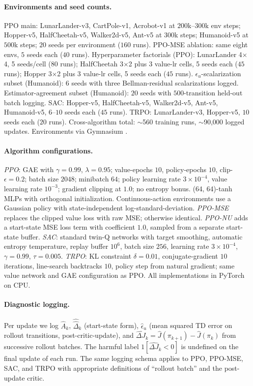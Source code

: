 \documentclass{article}
\begin{document}
\paragraph{Environments and seed counts.}
PPO main: LunarLander-v3, CartPole-v1, Acrobot-v1 at $200$k--$300$k env steps; Hopper-v5, HalfCheetah-v5, Walker2d-v5, Ant-v5 at $300$k steps; Humanoid-v5 at $500$k steps; $20$ seeds per environment ($160$ runs). PPO-MSE ablation: same eight envs, $5$ seeds each ($40$ runs). Hyperparameter factorials (PPO): LunarLander 4$\times$4, 5 seeds/cell ($80$ runs); HalfCheetah 3$\times$2 plus 3 value-lr cells, 5 seeds each ($45$ runs); Hopper 3$\times$2 plus 3 value-lr cells, 5 seeds each ($45$ runs). $\epsilon_u$-scalarization subset (Humanoid): $6$ seeds with three Bellman-residual scalarizations logged. Estimator-agreement subset (Humanoid): $20$ seeds with $500$-transition held-out batch logging. SAC: Hopper-v5, HalfCheetah-v5, Walker2d-v5, Ant-v5, Humanoid-v5, $6$--$10$ seeds each ($45$ runs). TRPO: LunarLander-v3, Hopper-v5, $10$ seeds each ($20$ runs). Cross-algorithm total: $\sim$560 training runs, $\sim$90{,}000 logged updates. Environments via Gymnasium \citep{towers2024gymnasium}.

\paragraph{Algorithm configurations.}
\emph{PPO}: GAE \citep{schulman2015high} with $\gamma{=}0.99$, $\lambda{=}0.95$; value-epochs $10$, policy-epochs $10$, clip-$\epsilon = 0.2$; batch size $2048$; minibatch $64$; policy learning rate $3{\times}10^{-4}$, value learning rate $10^{-3}$; gradient clipping at $1.0$; no entropy bonus. (64, 64)-tanh MLPs with orthogonal initialization. Continuous-action environments use a Gaussian policy with state-independent log-standard-deviation. \emph{PPO-MSE} replaces the clipped value loss with raw MSE; otherwise identical. \emph{PPO-NU} adds a start-state MSE loss term with coefficient $1.0$, sampled from a separate start-state buffer. \emph{SAC}: standard twin-Q networks with target smoothing, automatic entropy temperature, replay buffer $10^6$, batch size $256$, learning rate $3{\times}10^{-4}$, $\gamma = 0.99$, $\tau = 0.005$. \emph{TRPO}: KL constraint $\delta = 0.01$, conjugate-gradient $10$ iterations, line-search backtracks $10$, policy step from natural gradient; same value network and GAE configuration as PPO. All implementations in PyTorch on CPU.

\paragraph{Diagnostic logging.}
Per update we log $\widehat{A}_k$, $\widehat{\hat\Delta}_k$ (start-state form), $\widehat\epsilon_u$ (mean squared TD error on rollout transitions, post-critic-update), and $\widehat{\Delta J}_k = \widehat{J}(\pi_{k+1}) - \widehat{J}(\pi_k)$ from successive rollout batches. The harmful label $1[\widehat{\Delta J}_k < 0]$ is undefined on the final update of each run. The same logging schema applies to PPO, PPO-MSE, SAC, and TRPO with appropriate definitions of ``rollout batch'' and the post-update critic.
\end{document}
